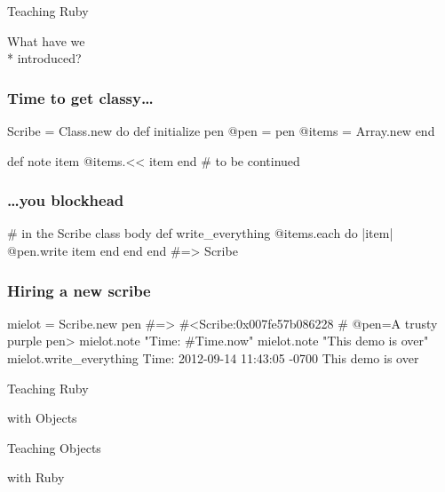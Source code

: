 \documentclass[20pt,aspectratio=169]{beamer}
\begin{document}
{
\begin{frame}
\par { Teaching Ruby}\par
\vspace{3cm}\hfill
{What have we\\* \hfill introduced?}
\end{frame}
}

\begin{frame}[fragile]
\frametitle{Time to get classy\ldots}
\begin{rubycode}
Scribe = Class.new do
  def initialize pen
    @pen = pen
    @items = Array.new
  end

  def note item
    @items.<< item
  end
  # to be continued
\end{rubycode}
\end{frame}

\begin{frame}[fragile]
\frametitle{\ldots{}you blockhead}
\begin{rubycode}
  # in the Scribe class body
  def write_everything
    @items.each do |item|
      @pen.write item
    end
  end
end
#=> Scribe
\end{rubycode}
\end{frame}

\begin{frame}[fragile]
\frametitle{Hiring a new scribe}
\begin{rubycode}
mielot = Scribe.new pen
#=> #<Scribe:0x007fe57b086228
#   @pen=A trusty purple pen>
mielot.note "Time: #{Time.now}"
mielot.note "This demo is over"
mielot.write_everything
Time: 2012-09-14 11:43:05 -0700
This demo is over
\end{rubycode}
\end{frame}

{
\begin{frame}
\par { Teaching Ruby}\par
\vspace{3cm}\hfill
{with Objects}
\end{frame}

\begin{frame}
\par { Teaching Objects}\par
\vspace{3cm}\hfill
{with Ruby}
\end{frame}
}
\end{document}
